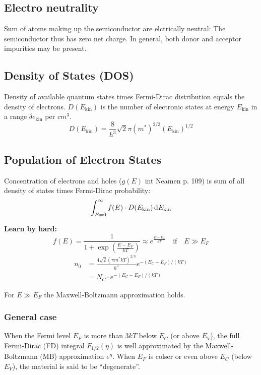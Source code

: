 \documentclass[a4paper, fontsize=8pt, landscape, DIV=1]{scrartcl}
\begin{document}
\begin{multicols*}{4}
  \subsection{Electro neutrality}
  Sum of atoms making up the semiconductor are elctrically neutral: The semiconductor thus has zero net charge.
  In general, both donor and acceptor impurities may be present.


  \subsection{Density of States (DOS)}
  Density of available quantum states times Fermi-Dirac distribution equals the density of electrons. $D(E_\text{kin})$ is the number of electronic states at energy $E_\text{kin}$ in a range $\delta e_\text{kin}$ per $cm^3$.
  \[D(E_\text{kin}) = \frac{8}{h^3}\sqrt{2}\pi(m^*)^{2/3}(E_\text{kin})^{1/2}\]

  \subsection{Population of Electron States}
  Concentration of electrons and holes ($g(E)$ int Neamen p. 109) is sum of all density of states times Fermi-Dirac probability:
  \[\int_{E=0}^\infty f(E) \cdot D(E_\text{kin})\,\mathrm{d} E_\text{kin}\]

  \textbf{Learn by hard:}
  \[f(E) = \frac{1}{1+\exp\left(\frac{E-E_F}{kT}\right)} \approx e^{\frac{E-E_F}{kT}} \quad\text{if} \quad E \gg E_F\]
  \begin{align*}
    n_0 &= \frac{4\sqrt{2}(\pi m^* kT)^{2/3}}{h^3}e^{-(E_C-E_F)/(kT)} \\
        &= N_C \cdot e^{-(E_C-E_F)/(kT)}
  \end{align*}

  For $E \gg E_F$ the Maxwell-Boltzmann approximation holds.

  \subsubsection{General case}
  When the Fermi level $E_F$ is more than $3kT$ below $E_C$ (or above $E_V$), the full Fermi-Dirac (FD) integral $F_{1/2}(\eta)$ is well approximated by the Maxwell-Boltzmann (MB) approximation $e^\eta$.
  When $E_F$ is colser or even above $E_C$ (below $E_V$), the material is said to be ``degenerate''.


\end{multicols*}
\end{document}
